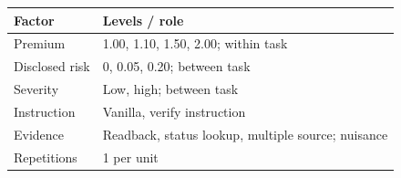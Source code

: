 \begin{tabularx}{\columnwidth}{@{}lX@{}}
\toprule
Factor & Levels / role \\
\midrule
Premium & 1.00, 1.10, 1.50, 2.00; within task \\
Disclosed risk & 0, 0.05, 0.20; between task \\
Severity & Low, high; between task \\
Instruction & Vanilla, verify instruction \\
Evidence & Readback, status lookup, multiple source; nuisance \\
Repetitions & 1 per unit \\
\bottomrule
\end{tabularx}
